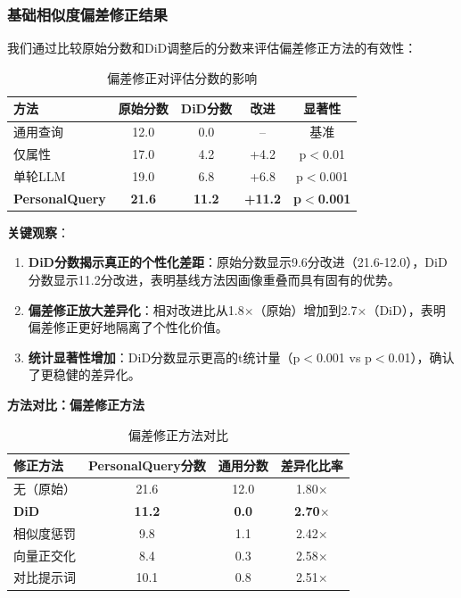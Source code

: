 \documentclass[11pt,a4paper]{article}
\begin{document}
\subsubsection{\textbf{基础相似度偏差修正结果}}

我们通过比较原始分数和DiD调整后的分数来评估偏差修正方法的有效性：

\begin{table}[h]
\centering
\begin{tabular}{lcccc}
\toprule
\textbf{方法} & \textbf{原始分数} & \textbf{DiD分数} & \textbf{改进} & \textbf{显著性} \\
\midrule
通用查询 & 12.0 & 0.0 & -- & 基准 \\
仅属性 & 17.0 & 4.2 & +4.2 & p$<$0.01 \\
单轮LLM & 19.0 & 6.8 & +6.8 & p$<$0.001 \\
\midrule
\textbf{PersonalQuery} & \textbf{21.6} & \textbf{11.2} & \textbf{+11.2} & \textbf{p$<$0.001} \\
\bottomrule
\end{tabular}
\caption{偏差修正对评估分数的影响}
\label{tab:bias}
\end{table}

\textbf{关键观察}：
\begin{enumerate}
    \item \textbf{DiD分数揭示真正的个性化差距}：原始分数显示9.6分改进（21.6-12.0），DiD分数显示11.2分改进，表明基线方法因画像重叠而具有固有的优势。

    \item \textbf{偏差修正放大差异化}：相对改进比从1.8$\times$（原始）增加到2.7$\times$（DiD），表明偏差修正更好地隔离了个性化价值。

    \item \textbf{统计显著性增加}：DiD分数显示更高的t统计量（p$<$0.001 vs p$<$0.01），确认了更稳健的差异化。
\end{enumerate}

\textbf{方法对比：偏差修正方法}

\begin{table}[h]
\centering
\begin{tabular}{lccc}
\toprule
\textbf{修正方法} & \textbf{PersonalQuery分数} & \textbf{通用分数} & \textbf{差异化比率} \\
\midrule
无（原始） & 21.6 & 12.0 & 1.80$\times$ \\
\midrule
\textbf{DiD} & \textbf{11.2} & \textbf{0.0} & \textbf{2.70$\times$} \\
相似度惩罚 & 9.8 & 1.1 & 2.42$\times$ \\
向量正交化 & 8.4 & 0.3 & 2.58$\times$ \\
对比提示词 & 10.1 & 0.8 & 2.51$\times$ \\
\bottomrule
\end{tabular}
\caption{偏差修正方法对比}
\label{tab:bias_methods}
\end{table}
\end{document}
